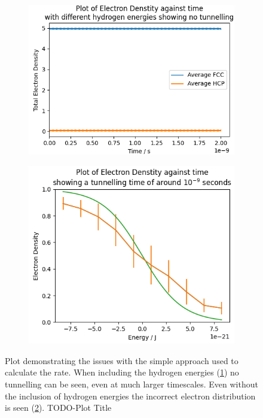 \begin{figure}[htbp]
    \centering
    \begin{subfigure}{0.45\linewidth}
        \includegraphics[width=0.9\linewidth]{Figures/Simulation/Plot of large band simulation with hydrogen energies.png}
        \label{fig:large band non degenerate simulation}
    \end{subfigure}
    \hfill
    \begin{subfigure}{0.45\linewidth}
        \includegraphics[width=0.9\linewidth]{Figures/Simulation/Plot of large band electron distribution.png}
        \label{fig:large band fermi-dirac}
    \end{subfigure}
    \caption{Plot demonstrating the issues with the
        simple approach used to calculate the rate.
        When including the hydrogen energies
        (\cref{fig:large band non degenerate simulation})
        no tunnelling can be seen, even
        at much larger timescales. Even without the
        inclusion of hydrogen energies
        the incorrect electron distribution is
        seen (\cref{fig:large band fermi-dirac}).
        TODO-Plot Title}\label{fig:issues with single large band}
\end{figure}

